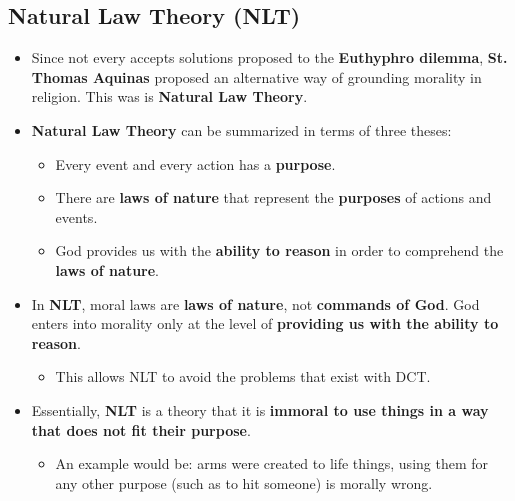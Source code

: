 \documentclass[16pt]{article}
\begin{document}
    \subsection*{Natural Law Theory (NLT)}
    \begin{itemize}
        \item Since not every accepts solutions proposed to the \textbf{Euthyphro dilemma}, \textbf{St. Thomas Aquinas} proposed an alternative way of grounding morality in religion. This was is \textbf{Natural Law Theory}.
        \item \textbf{Natural Law Theory} can be summarized in terms of three theses:
        \begin{itemize}
            \item Every event and every action has a \textbf{purpose}.
            \item There are \textbf{laws of nature} that represent the \textbf{purposes} of actions and events.
            \item God provides us with the \textbf{ability to reason} in order to comprehend the \textbf{laws of nature}.
        \end{itemize}
        \item In \textbf{NLT}, moral laws are \textbf{laws of nature}, not \textbf{commands of God}. God enters into morality only at the level of \textbf{providing us with the ability to reason}.
        \begin{itemize}
            \item This allows NLT to avoid the problems that exist with DCT.
        \end{itemize}
        \item Essentially, \textbf{NLT} is a theory that it is \textbf{immoral to use things in a way that does not fit their purpose}.
        \begin{itemize}
            \item An example would be: arms were created to life things, using them for any other purpose (such as to hit someone) is morally wrong.
        \end{itemize}
    \end{itemize}
\end{document}
